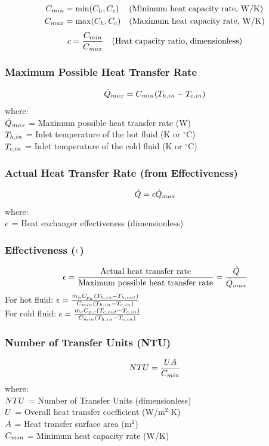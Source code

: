 \begin{align}
    C_{min} &= \min(C_h, C_c) && \text{(Minimum heat capacity rate, W/K)} \\
    C_{max} &= \max(C_h, C_c) && \text{(Maximum heat capacity rate, W/K)}
\end{align}
\begin{equation}
    c = \frac{C_{min}}{C_{max}} \quad \text{(Heat capacity ratio, dimensionless)}
\end{equation}

\subsubsection*{Maximum Possible Heat Transfer Rate}
\begin{equation}
    \dot{Q}_{max} = C_{min} (T_{h,in} - T_{c,in})
\end{equation}
where: \\
$\dot{Q}_{max}$ = Maximum possible heat transfer rate (W) \\
$T_{h,in}$ = Inlet temperature of the hot fluid (K or $^\circ$C) \\
$T_{c,in}$ = Inlet temperature of the cold fluid (K or $^\circ$C)

\subsubsection*{Actual Heat Transfer Rate (from Effectiveness)}
\begin{equation}
    \dot{Q} = \epsilon \dot{Q}_{max}
\end{equation}
where: \\
$\epsilon$ = Heat exchanger effectiveness (dimensionless)

\subsubsection*{Effectiveness ($\epsilon$)}
\begin{equation}
    \epsilon = \frac{\text{Actual heat transfer rate}}{\text{Maximum possible heat transfer rate}} = \frac{\dot{Q}}{\dot{Q}_{max}}
\end{equation}
For hot fluid: $\epsilon = \frac{\dot{m}_h C_{p_h} (T_{h,in} - T_{h,out})}{C_{min} (T_{h,in} - T_{c,in})}$ \\
For cold fluid: $\epsilon = \frac{\dot{m}_c C_{p,c} (T_{c,out} - T_{c,in})}{C_{min} (T_{h,in} - T_{c,in})}$

\subsubsection*{Number of Transfer Units (NTU)}
\begin{equation}
    NTU = \frac{U A}{C_{min}}
\end{equation}
where: \\
$NTU$ = Number of Transfer Units (dimensionless) \\
$U$ = Overall heat transfer coefficient (W/m$^2$$\cdot$K) \\
$A$ = Heat transfer surface area (m$^2$) \\
$C_{min}$ = Minimum heat capacity rate (W/K)

